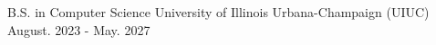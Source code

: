 

\begin{cventries}
%
%

  \cventry
  {B.S. in Computer Science} %
  {University of Illinois Urbana-Champaign (UIUC)} %
  {} %
  {August. 2023 - May. 2027} %
  {
  }


\end{cventries}
